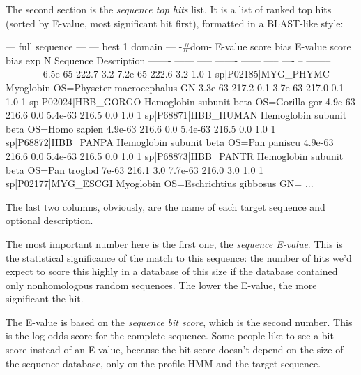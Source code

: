 The second section is the \emph{sequence top hits} list. It is a list
of ranked top hits (sorted by E-value, most significant hit first),
formatted in a BLAST-like style:

\begin{samepage}
\begin{sreoutput}
   --- full sequence ---   --- best 1 domain ---    -#dom-
    E-value  score  bias    E-value  score  bias    exp  N  Sequence              Description
    ------- ------ -----    ------- ------ -----   ---- --  --------              -----------
    6.5e-65  222.7   3.2    7.2e-65  222.6   3.2    1.0  1  sp|P02185|MYG_PHYMC    Myoglobin OS=Physeter macrocephalus GN
    3.3e-63  217.2   0.1    3.7e-63  217.0   0.1    1.0  1  sp|P02024|HBB_GORGO    Hemoglobin subunit beta OS=Gorilla gor
    4.9e-63  216.6   0.0    5.4e-63  216.5   0.0    1.0  1  sp|P68871|HBB_HUMAN    Hemoglobin subunit beta OS=Homo sapien
    4.9e-63  216.6   0.0    5.4e-63  216.5   0.0    1.0  1  sp|P68872|HBB_PANPA    Hemoglobin subunit beta OS=Pan paniscu
    4.9e-63  216.6   0.0    5.4e-63  216.5   0.0    1.0  1  sp|P68873|HBB_PANTR    Hemoglobin subunit beta OS=Pan troglod
      7e-63  216.1   3.0    7.7e-63  216.0   3.0    1.0  1  sp|P02177|MYG_ESCGI    Myoglobin OS=Eschrichtius gibbosus GN=
 ...      
\end{sreoutput}
\end{samepage}

The last two columns, obviously, are the name of each target sequence
and optional description.

The most important number here is the first one, the \emph{sequence
E-value}. This is the statistical significance of the match to this
sequence: the number of hits we'd expect to score this highly in a
database of this size if the database contained only nonhomologous
random sequences. The lower the E-value, the more significant the hit.

The E-value is based on the \emph{sequence bit score}, which is the
second number. This is the log-odds score for the complete sequence.
Some people like to see a bit score instead of an E-value, because the
bit score doesn't depend on the size of the sequence database, only on
the profile HMM and the target sequence.

